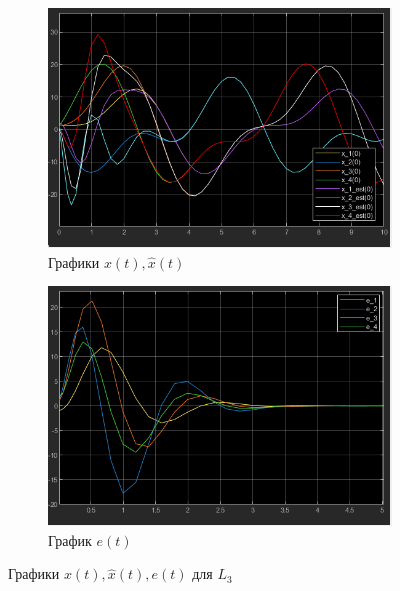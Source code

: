 \documentclass[a4paper, 12pt]{article}
\begin{document}
    \begin{figure}[H]
        \centering
        \begin{subfigure}{0.45\textwidth}
            \centering
            \includegraphics[width=\linewidth]{x_t_x_est_t_l3_task2.png}
            \caption{Графики $x(t),\hat{x}(t)$}
            \label{fig:task_2_x_t_l3}
        \end{subfigure}
        \hfill
        \begin{subfigure}{0.45\textwidth}
            \centering
            \includegraphics[width=\linewidth]{e_l3_task2.png}
            \caption{График $e(t)$}
            \label{fig:task_2_e_l3}
        \end{subfigure}
        \caption{Графики $x(t),\hat{x}(t),e(t)$ для $L_3$}
        \label{fig:task_2_modeling_3}
    \end{figure}
\end{document}
